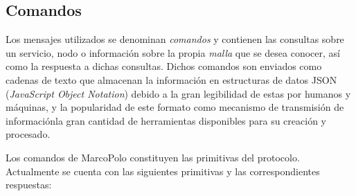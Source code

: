 \subsection{Comandos}

Los mensajes utilizados se denominan \textit{comandos} y contienen las consultas sobre un servicio, nodo o información sobre la propia \textit{malla} que se desea conocer, así como la respuesta a dichas consultas. Dichos comandos son enviados como cadenas de texto que almacenan la información en estructuras de datos JSON (\textit{JavaScript Object Notation}) debido a la gran legibilidad de estas por humanos y máquinas, y la popularidad de este formato como mecanismo de transmisión de informaciónla gran cantidad de herramientas disponibles para su creación y procesado.

Los comandos de MarcoPolo constituyen las primitivas del protocolo. Actualmente se cuenta con las siguientes primitivas y las correspondientes respuestas:

